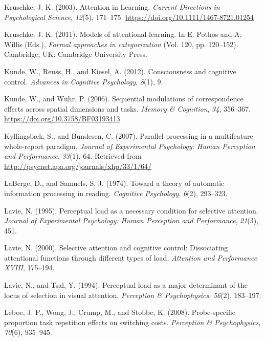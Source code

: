 \documentclass[]{DissertateCUNY}
\begin{document}
\leavevmode\hypertarget{ref-kruschke_attention_2003}{}%
Kruschke, J. K. (2003). Attention in Learning. \emph{Current Directions
in Psychological Science}, \emph{12}(5), 171--175.
\url{https://doi.org/10.1111/1467-8721.01254}

\leavevmode\hypertarget{ref-kruschke_models_2011}{}%
Kruschke, J. K. (2011). Models of attentional learning. In E. Pothos and
A. Willis (Eds.), \emph{Formal approaches in categorization} (Vol. 120,
pp. 120--152). Cambridge, UK: Cambridge University Press.

\leavevmode\hypertarget{ref-kunde_consciousness_2012}{}%
Kunde, W., Reuss, H., and Kiesel, A. (2012). Consciousness and cognitive
control. \emph{Advances in Cognitive Psychology}, \emph{8}(1), 9.

\leavevmode\hypertarget{ref-kunde_sequential_2006}{}%
Kunde, W., and Wühr, P. (2006). Sequential modulations of correspondence
effects across spatial dimensions and tasks. \emph{Memory \& Cognition},
\emph{34}, 356--367. \url{https://doi.org/10.3758/BF03193413}

\leavevmode\hypertarget{ref-kyllingsbaek_parallel_2007}{}%
Kyllingsbæk, S., and Bundesen, C. (2007). Parallel processing in a
multifeature whole-report paradigm. \emph{Journal of Experimental
Psychology: Human Perception and Performance}, \emph{33}(1), 64.
Retrieved from \url{http://psycnet.apa.org/journals/xhp/33/1/64/}

\leavevmode\hypertarget{ref-laberge_toward_1974}{}%
LaBerge, D., and Samuels, S. J. (1974). Toward a theory of automatic
information processing in reading. \emph{Cognitive Psychology},
\emph{6}(2), 293--323.

\leavevmode\hypertarget{ref-lavie_perceptual_1995}{}%
Lavie, N. (1995). Perceptual load as a necessary condition for selective
attention. \emph{Journal of Experimental Psychology: Human Perception
and Performance}, \emph{21}(3), 451.

\leavevmode\hypertarget{ref-lavie_selective_2000}{}%
Lavie, N. (2000). Selective attention and cognitive control:
Dissociating attentional functions through different types of load.
\emph{Attention and Performance XVIII}, 175--194.

\leavevmode\hypertarget{ref-lavie_perceptual_1994}{}%
Lavie, N., and Tsal, Y. (1994). Perceptual load as a major determinant
of the locus of selection in visual attention. \emph{Perception \&
Psychophysics}, \emph{56}(2), 183--197.

\leavevmode\hypertarget{ref-leboe_probe-specific_2008}{}%
Leboe, J. P., Wong, J., Crump, M., and Stobbe, K. (2008). Probe-specific
proportion task repetition effects on switching costs. \emph{Perception
\& Psychophysics}, \emph{70}(6), 935--945.
\end{document}
